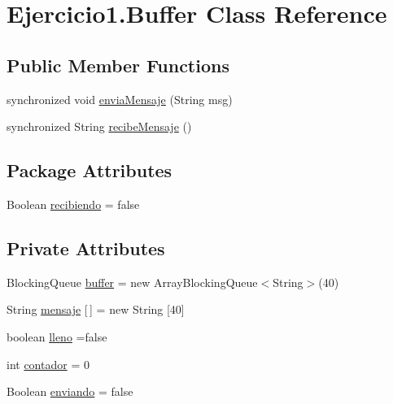 \hypertarget{class_ejercicio1_1_1_buffer}{}\section{Ejercicio1.\+Buffer Class Reference}
\label{class_ejercicio1_1_1_buffer}
\subsection*{Public Member Functions}
\begin{DoxyCompactItemize}
\item 
synchronized void \mbox{\hyperlink{class_ejercicio1_1_1_buffer_ae8a567959dc32c3965d89f487e2b889f}{envia\+Mensaje}} (String msg)
\item 
synchronized String \mbox{\hyperlink{class_ejercicio1_1_1_buffer_a534af142b15755b1e0d4c6511e37683b}{recibe\+Mensaje}} ()
\end{DoxyCompactItemize}
\subsection*{Package Attributes}
\begin{DoxyCompactItemize}
\item 
Boolean \mbox{\hyperlink{class_ejercicio1_1_1_buffer_afdd9e035a2241756d0af2c6c75e51e16}{recibiendo}} = false
\end{DoxyCompactItemize}
\subsection*{Private Attributes}
\begin{DoxyCompactItemize}
\item 
Blocking\+Queue \mbox{\hyperlink{class_ejercicio1_1_1_buffer_a8aac505cb8d56d8242ef65e0701079bf}{buffer}} = new Array\+Blocking\+Queue$<$String$>$(40)
\item 
String \mbox{\hyperlink{class_ejercicio1_1_1_buffer_a65724a90ec1aad8e0123885df33c1b2d}{mensaje}} \mbox{[}$\,$\mbox{]} = new String \mbox{[}40\mbox{]}
\item 
boolean \mbox{\hyperlink{class_ejercicio1_1_1_buffer_ac31a3784041537125eb245e82a5dcc8f}{lleno}} =false
\item 
int \mbox{\hyperlink{class_ejercicio1_1_1_buffer_a2d253914c2d2e673971f0486f0499e82}{contador}} = 0
\item 
Boolean \mbox{\hyperlink{class_ejercicio1_1_1_buffer_a7aa644ce09536853de7eb8568628db7b}{enviando}} = false
\end{DoxyCompactItemize}



